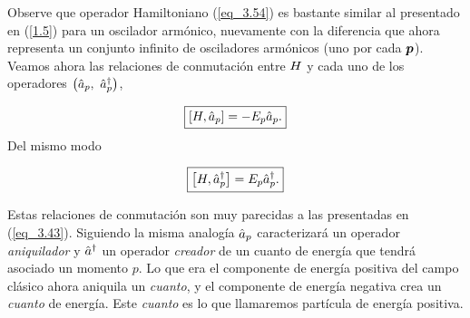 Observe que operador Hamiltoniano (\ref{eq_3.54}) es bastante similar al presentado en (\ref{1.5}) para un oscilador armónico, nuevamente con la diferencia que ahora representa un conjunto infinito de osciladores armónicos (uno por cada $\vb*{p}$). Veamos ahora las relaciones de conmutación entre $H$ y cada uno de los operadores $\qty(\hat{a}_p,~\hat{a}_p^\dag)$,

\begin{equation}
    \boxed{
    \comm{\OH}{\Oa_p} = -E_p \Oa_p.}
    \label{eq_3.55}
\end{equation}
Del mismo modo

\begin{equation}
    \boxed{
    \comm{\OH}{\Oa_p^\dag} = E_p \Oa_p^\dag.}
    \label{eq_3.56}
\end{equation}

Estas relaciones de conmutación son muy parecidas a las presentadas en (\ref{eq_3.43}). Siguiendo la misma analogía $\hat{a}_p$ caracterizará un operador \emph{aniquilador}  y $\hat{a}^\dagger$ un operador \emph{creador} de un cuanto de energía que tendrá asociado un momento $p$. Lo que era el componente de energía positiva del campo clásico ahora aniquila un \emph{cuanto}, y el componente de energía negativa crea un \emph{cuanto} de energía. Este \emph{cuanto} es lo que llamaremos partícula de energía positiva.\\

